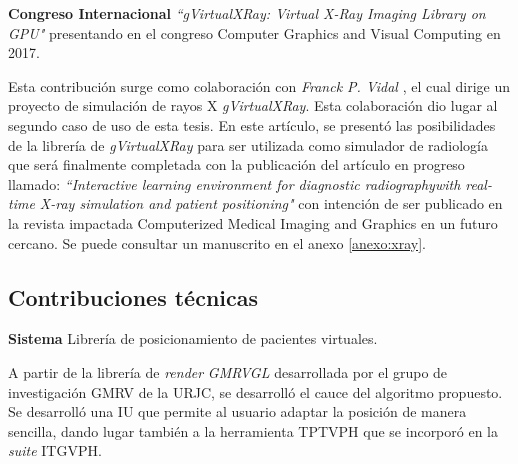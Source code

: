 \textbf{ Congreso Internacional }\emph{``gVirtualXRay: Virtual X-Ray Imaging Library on GPU"}\cite{sujar:hal} presentando en el congreso Computer Graphics and Visual Computing en 2017.

Esta contribución surge como colaboración con \emph{Franck P. Vidal} \cite{gVirtualXRay}, el cual dirige un proyecto de simulación de rayos X \emph{gVirtualXRay}. Esta colaboración dio lugar al segundo caso de uso de esta tesis. En este artículo, se presentó las posibilidades de la librería de \emph{gVirtualXRay} para ser utilizada como simulador de radiología que será finalmente completada con la publicación del artículo en progreso llamado: \emph{``Interactive learning environment for diagnostic radiographywith real-time X-ray simulation and patient positioning"} con intención de ser publicado en la revista impactada Computerized Medical Imaging and Graphics en un futuro cercano. Se puede consultar un manuscrito en el anexo \ref{anexo:xray}.







\subsection{Contribuciones técnicas}
\label{conclu:tecnica}





\textbf{ Sistema } Librería de posicionamiento de pacientes virtuales.

A partir de la librería de \emph{render} \emph{GMRVGL} desarrollada por el grupo de investigación \ac{GMRV} de la \ac{URJC}, se desarrolló el cauce del algoritmo propuesto. Se desarrolló una \ac{IU} que permite al usuario adaptar la posición de manera sencilla, dando lugar también a la herramienta \ac{TPTVPH} que se incorporó en la \emph{suite} \ac{ITGVPH}.

